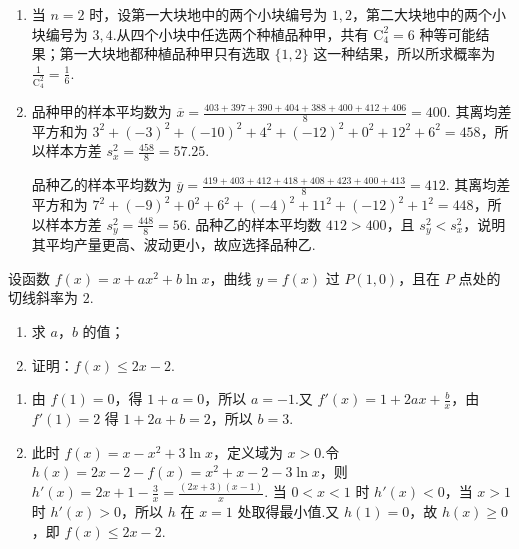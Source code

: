 \begin{solution}
\begin{enumerate}
\item 当 \(n=2\) 时，设第一大块地中的两个小块编号为 \(1,2\)，第二大块地中的两个小块编号为 \(3,4\).从四个小块中任选两个种植品种甲，共有 \(\mathrm C_4^2=6\) 种等可能结果；第一大块地都种植品种甲只有选取 \(\{1,2\}\) 这一种结果，所以所求概率为 \(\displaystyle \frac{1}{\mathrm C_4^2}=\frac16\).
\item 品种甲的样本平均数为
\(\displaystyle \overline{x}=\frac{403+397+390+404+388+400+412+406}{8}=400\).
其离均差平方和为
\(\displaystyle 3^2+(-3)^2+(-10)^2+4^2+(-12)^2+0^2+12^2+6^2=458\)，所以样本方差
\(\displaystyle s_x^2=\frac{458}{8}=57.25\).

品种乙的样本平均数为
\(\displaystyle \overline{y}=\frac{419+403+412+418+408+423+400+413}{8}=412\).
其离均差平方和为
\(\displaystyle 7^2+(-9)^2+0^2+6^2+(-4)^2+11^2+(-12)^2+1^2=448\)，所以样本方差
\(\displaystyle s_y^2=\frac{448}{8}=56\).
品种乙的样本平均数 \(412>400\)，且 \(s_y^2<s_x^2\)，说明其平均产量更高、波动更小，故应选择品种乙.
\end{enumerate}
\end{solution}

\begin{problem}
设函数 \(f(x) = x + ax^{2} + b \ln x\)，曲线 \(y = f(x)\) 过 \(P(1,0)\)，且在 \(P\) 点处的切线斜率为 \(2\).
\begin{enumerate}
\item 求 \(a\)，\(b\) 的值；
\item 证明：\(f(x) \leqslant 2x - 2\).
\end{enumerate}
\end{problem}

\begin{solution}
\begin{enumerate}
\item 由 \(f(1)=0\)，得 \(1+a=0\)，所以 \(a=-1\).又
\(\displaystyle f'(x)=1+2ax+\frac{b}{x}\)，由 \(f'(1)=2\) 得 \(1+2a+b=2\)，所以 \(b=3\).
\item 此时 \(f(x)=x-x^2+3\ln x\)，定义域为 \(x>0\).令
\(\displaystyle h(x)=2x-2-f(x)=x^2+x-2-3\ln x\)，则
\(\displaystyle h'(x)=2x+1-\frac3x=\frac{(2x+3)(x-1)}x\).
当 \(0<x<1\) 时 \(h'(x)<0\)，当 \(x>1\) 时 \(h'(x)>0\)，所以 \(h\) 在 \(x=1\) 处取得最小值.又 \(h(1)=0\)，故 \(h(x)\geq0\)，即 \(f(x)\leq2x-2\).
\end{enumerate}
\end{solution}

